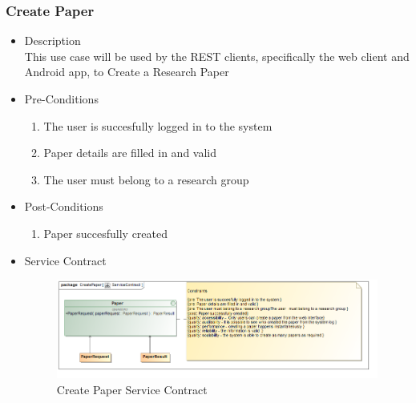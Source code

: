 \documentclass[a4paper,10pt]{article}
\begin{document}
\subsubsection{Create Paper}
	\begin{itemize}
		\item Description\\
			This use case will be used by the REST clients, specifically the web client and Android app, to Create a Research Paper
		\item Pre-Conditions
			\begin{enumerate}
				\item The user is succesfully logged in to the system
				\item Paper details are filled in and valid
				\item The user must belong to a research group
			\end{enumerate}
		\item Post-Conditions
			\begin{enumerate}
				\item Paper succesfully created

						
			\end{enumerate}
		\item Service Contract
			\begin{figure}[H]
				\includegraphics[scale=0.5]{CreatePaperServiceContract}
				\caption{Create Paper Service Contract}
			\end{figure}



	\end{itemize}
\end{document}
